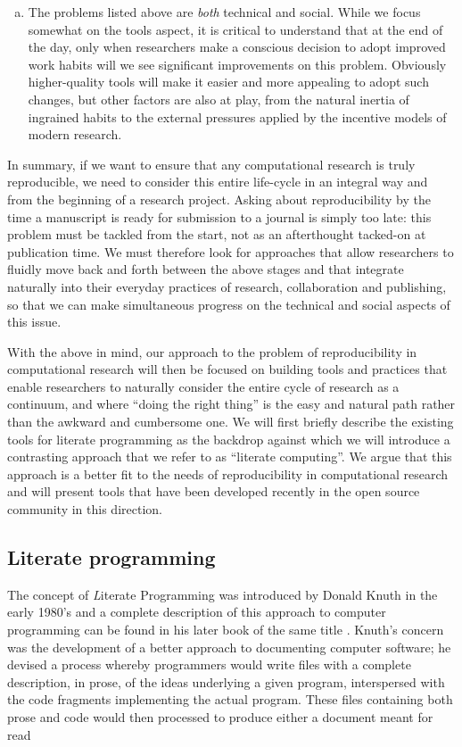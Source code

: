\documentclass[ChapterTOCs,krantz2]{krantz} %
\begin{document}
\begin{enumerate}[(a)]
\item The problems listed above are \emph{both} technical and social.  While we
  focus somewhat on the tools aspect, it is critical to understand that at the
  end of the day, only when researchers make a conscious decision to adopt
  improved work habits will we see significant improvements on this problem.
  Obviously higher-quality tools will make it easier and more appealing to
  adopt such changes, but other factors are also at play, from the natural
  inertia of ingrained habits to the external pressures applied by the
  incentive models of modern research.
\end{enumerate}

In summary, if we want to ensure that any computational research is truly
reproducible, we need to consider this entire life-cycle in an integral way and
from the beginning of a research project.  Asking about reproducibility by the
time a manuscript is ready for submission to a journal is simply too late: this
problem must be tackled from the start, not as an afterthought tacked-on at
publication time.  We must therefore look for approaches that allow researchers
to fluidly move back and forth between the above stages and that integrate
naturally into their everyday practices of research, collaboration and
publishing, so that we can make simultaneous progress on the technical and
social aspects of this issue.

With the above in mind, our approach to the problem of reproducibility in
computational research will then be focused on building tools and practices
that enable researchers to naturally consider the entire cycle of research as a
continuum, and where ``doing the right thing'' is the easy and natural path
rather than the awkward and cumbersome one.  We will first briefly describe the
existing tools for literate programming as the backdrop against which we will
introduce a contrasting approach that we refer to as ``literate computing''.
We argue that this approach is a better fit to the needs of reproducibility in
computational research and will present tools that have been developed recently
in the open source community in this direction.

\subsection{Literate programming}

The concept of {\emph Literate Programming} was introduced by Donald Knuth in
the early 1980's \cite{Knuth:1983:LP} and a complete description of this
approach to computer programming can be found in his later book of the same
title \cite{Knuth92}.  Knuth's concern was the development of a better approach
to documenting computer software; he devised a process whereby programmers would
write files with a complete description, in prose, of the ideas underlying a
given program, interspersed with the code fragments implementing the actual
program.  These files containing both prose and code would then  processed to
produce either a document meant for read
\end{document}

